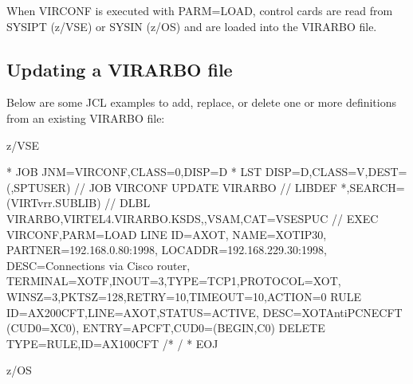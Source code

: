 \documentclass[letterpaper,10pt,english]{sphinxmanual}
\begin{document}
\sphinxAtStartPar
{}

\sphinxAtStartPar
When VIRCONF is executed with PARM=LOAD, control cards are read from SYSIPT (z/VSE) or SYSIN (z/OS) and are loaded into the VIRARBO file.


\subsection{Updating a VIRARBO file}
\label{\detokenize{Installation_Guide:updating-a-virarbo-file}}
\sphinxAtStartPar
Below are some JCL examples to add, replace, or delete one or more definitions from an existing VIRARBO file:\sphinxhyphen{}

\ignorespaces 
\sphinxAtStartPar
z/VSE

\begin{sphinxVerbatim}[commandchars=\\\{\}]
* \PYGZdl{}\PYGZdl{} JOB JNM=VIRCONF,CLASS=0,DISP=D
* \PYGZdl{}\PYGZdl{} LST DISP=D,CLASS=V,DEST=(,SPTUSER)
// JOB VIRCONF UPDATE VIRARBO
// LIBDEF *,SEARCH=(VIRTvrr.SUBLIB)
// DLBL VIRARBO,\PYGZsq{}VIRTEL4.VIRARBO.KSDS\PYGZsq{},,VSAM,CAT=VSESPUC
// EXEC VIRCONF,PARM=\PYGZsq{}LOAD\PYGZsq{}
        LINE  ID=A\PYGZhy{}XOT,
              NAME=XOT\PYGZhy{}IP30,
              PARTNER=192.168.0.80:1998,
              LOCADDR=192.168.229.30:1998,
              DESC=\PYGZsq{}Connections via Cisco router\PYGZsq{},
              TERMINAL=XOTF,INOUT=3,TYPE=TCP1,PROTOCOL=XOT,
              WINSZ=3,PKTSZ=128,RETRY=10,TIMEOUT=10,ACTION=0
        RULE ID=AX200CFT,LINE=A\PYGZhy{}XOT,STATUS=ACTIVE,
              DESC=\PYGZdq{}XOT\PYGZhy{}\PYGZgt{}AntiPCNE\PYGZhy{}\PYGZgt{}CFT (CUD0=X\PYGZsq{}C0\PYGZsq{})\PYGZdq{},
              ENTRY=APCFT,CUD0=(BEGIN,C0)
        DELETE TYPE=RULE,ID=AX100CFT
/*
/\PYGZam{}
* \PYGZdl{}\PYGZdl{} EOJ
\end{sphinxVerbatim}

\sphinxAtStartPar
{}

\ignorespaces 
\sphinxAtStartPar
z/OS
\end{document}
